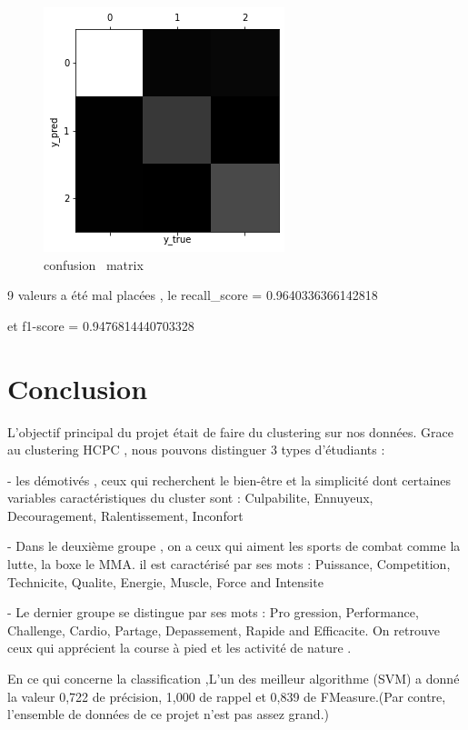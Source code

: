 \documentclass[12pt]{article}
\begin{document}
\begin{figure}[H]
\begin{center}
\includegraphics[scale=0.6]{confusion_matrix_2.png} 
\caption[]{confusion \ matrix}
\end{center}
\end{figure}

9 valeurs a été mal placées , le  recall\_score =  0.9640336366142818

 et f1-score =  0.9476814440703328


\section{Conclusion}
L'objectif principal du projet était de faire du  clustering sur nos données.
Grace au clustering HCPC , nous pouvons distinguer 3 types d'étudiants :

- les démotivés , ceux qui recherchent le bien-être et la simplicité dont certaines variables caractéristiques du cluster sont :  Culpabilite, Ennuyeux,  Decouragement, Ralentissement, Inconfort 

- Dans le deuxième groupe , on a ceux qui aiment les sports de combat comme la lutte, la boxe le MMA. il est caractérisé par ses mots : Puissance, Competition, Technicite, Qualite, Energie, Muscle, Force and Intensite 

- Le dernier groupe  se distingue par ses mots : Pro
gression, Performance, Challenge, Cardio, Partage, Depassement, Rapide and Efficacite. 
On retrouve ceux qui apprécient la course à pied et les activité de nature . 

En ce qui concerne la classification ,L'un des meilleur algorithme (SVM) a donné la valeur 0,722 de précision, 1,000 de rappel et 0,839 de FMeasure.(Par contre, l'ensemble de données de ce projet n'est pas assez grand.)
\end{document}
